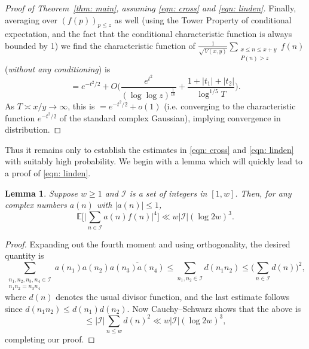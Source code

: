 \documentclass[12pt, notitlepage]{amsart}
\numberwithin{equation}{section}
\def\E{\mathbb E}
\newtheorem{lemma}[theorem]{Lemma}
\theoremstyle{remark}
\theoremstyle{definition}
\theoremstyle{remark}
\numberwithin{equation}{section}
\begin{document}
\begin{proof}[Proof of Theorem~\ref{thm: main}, assuming \eqref{eqn: cross} and  \eqref{eqn: linden}]
Finally, averaging over $(f(p))_{p\le z}$ as well (using the Tower Property of conditional expectation, and the fact that the conditional characteristic function is always bounded by 1) we find the characteristic function of $\frac{1}{\sqrt{V(x,y)}} \sum_{\substack{x\le n \le x+y \\ P(n)>z}  } f(n)$ ({\em without any conditioning}) is
$$ 
= e^{-t^2/2} + O\Big(\frac{e^{t^2}}{(\log\log z)^{\frac{1}{10}}} + \frac{1 + |t_1| + |t_2|}{\log^{1/5}T} \Big) . 
$$
As $T \asymp x/y \rightarrow \infty$, this is $= e^{-t^2/2} + o(1)$ (i.e. converging to the characteristic function $e^{-t^2/2}$ of the standard complex Gaussian), implying convergence in distribution.
\end{proof}


Thus it remains only to establish the estimates in \eqref{eqn: cross} and \eqref{eqn: linden} with suitably high probability.  We begin with a lemma which will quickly lead to a proof of \eqref{eqn: linden}.  

\begin{lemma} \label{lem4.3}  Suppose $w \ge 1$ and ${\mathcal I}$ is a set of integers in $[1,w]$.   Then, for any complex numbers $a(n)$ with $|a(n)|\le 1$,  
$$ 
\E\Big[ \Big| \sum_{n\in {\mathcal I}} a(n) f(n) \Big|^4 \Big] \ll w |{\mathcal I}| (\log 2w)^3. 
$$
\end{lemma} 
 \begin{proof}  Expanding out the fourth moment and using orthogonality, the desired quantity is
 $$ 
 \sum_{\substack{ n_1, n_2, n_3, n_4 \in {\mathcal I}\\ n_1 n_2= n_3 n_4}} a(n_1) a(n_2) \overline{a(n_3) a(n_4)} \le \sum_{n_1, n_2 \in {\mathcal I}} d(n_1 n_2) \le \Big(\sum_{n\in {\mathcal I}} d(n) \Big)^2, 
 $$ 
 where $d(n)$ denotes the usual divisor function, and the last estimate follows since $d(n_1 n_2) \le d(n_1) d(n_2)$.  Now Cauchy--Schwarz shows that the above is 
 $$ 
 \le |{\mathcal I}| \sum_{n\le w} d(n)^2 \ll w |{\mathcal I}| (\log 2w)^3, 
 $$
 completing our proof.
 \end{proof} 
 
\end{document}
